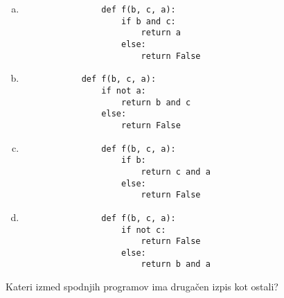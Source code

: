 \documentclass[arhiv, 10pt]{../izpit}
\begin{document}
        \begin{multicols}{2}
        \begin{enumerate}[(a)]
\item 
                \begin{verbatim}
                def f(b, c, a):
                    if b and c:
                        return a
                    else:
                        return False
                \end{verbatim}
            
\item 
            \begin{verbatim}
            def f(b, c, a):
                if not a:
                    return b and c
                else:
                    return False
            \end{verbatim}
        
\item 
                \begin{verbatim}
                def f(b, c, a):
                    if b:
                        return c and a
                    else:
                        return False
                \end{verbatim}
            
\item 
                \begin{verbatim}
                def f(b, c, a):
                    if not c:
                        return False
                    else:
                        return b and a
                \end{verbatim}
            
\end{enumerate}

        \end{multicols}
    
        \naloga*
        
        Kateri izmed spodnjih programov ima drugačen izpis kot ostali?
    
\end{document}
